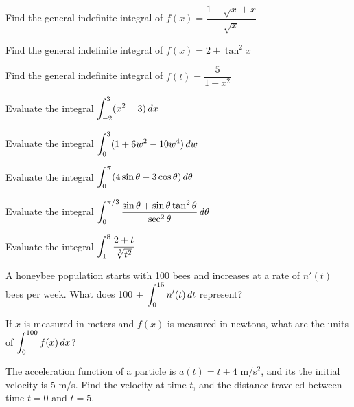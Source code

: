 \documentclass[notes]{subfiles}
\begin{document}
		\begin{ex}
			Find the general indefinite integral of \(f(x) = \dfrac{1-\sqrt{x}+x}{\sqrt{x}}\)
		\end{ex}
			
		\begin{ex}
			Find the general indefinite integral of \(f(x) = 2+\tan^2x\)
		\end{ex}
			\newpage
			
		\begin{ex}
			Find the general indefinite integral of \(f(t) = \dfrac{5}{1+x^2}\)
		\end{ex}
			
		\begin{ex}
			Evaluate the integral \(\displaystyle \int_{-2}^3 (x^2-3)\, dx\)
		\end{ex}
			
		\begin{ex}
			Evaluate the integral \(\displaystyle \int_0^3 (1 + 6w^2-10w^4)\,dw\)
		\end{ex}
			
		\begin{ex}
			Evaluate the integral \(\displaystyle \int_0^\pi (4\sin \theta -3\cos\theta)\, d\theta\)
		\end{ex}
			
		\begin{ex}
			Evaluate the integral \(\displaystyle \int_0^{\pi/3} \dfrac{\sin\theta + \sin\theta\tan^2\theta}{\sec^2\theta}\,d\theta\)
		\end{ex}
			\newpage
			
		\begin{ex}
			Evaluate the integral \(\displaystyle \int_1^8 \dfrac{2+t}{\sqrt[3]{t^2}}\)
		\end{ex}
			
		\begin{ex}
			A honeybee population starts with 100 bees and increases at a rate of \(n'(t)\) bees per week.  What does 100 + \(\displaystyle \int_0^{15}n'(t)\,dt\) represent?
		\end{ex}
			
		\begin{ex}
			If \(x\) is measured in meters and \(f(x)\) is measured in newtons, what are the units of \(\displaystyle \int_0^{100}f(x)\,dx\)?
		\end{ex}
			
		\begin{ex}
			The acceleration function of a particle is \(a(t) = t+4\) m/s\(^2\), and its the initial velocity is 5 m/s.  Find the velocity at time \(t\), and the distance traveled between time \(t = 0\) and \(t = 5\).
		\end{ex}
			\newpage
			
\end{document}
